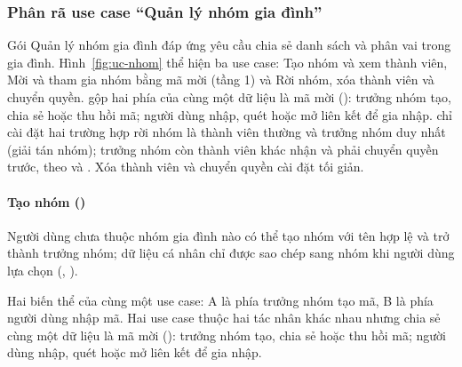 \subsubsection{Phân rã use case “Quản lý nhóm gia đình”}\label{sssec:pr-nhom}

Gói Quản lý nhóm gia đình đáp ứng yêu cầu chia sẻ danh sách và phân vai trong gia đình. Hình~\ref{fig:uc-nhom} thể hiện ba use case:  Tạo nhóm và xem thành viên,  Mời và tham gia nhóm bằng mã mời (tầng 1) và  Rời nhóm, xóa thành viên và chuyển quyền.  gộp hai phía của cùng một dữ liệu là mã mời (): trưởng nhóm tạo, chia sẻ hoặc thu hồi mã; người dùng nhập, quét hoặc mở liên kết để gia nhập.  chỉ cài đặt hai trường hợp rời nhóm là thành viên thường và trưởng nhóm duy nhất (giải tán nhóm); trưởng nhóm còn thành viên khác nhận  và phải chuyển quyền trước, theo  và . Xóa thành viên và chuyển quyền cài đặt tối giản.



\paragraph*{Tạo nhóm ()}
Người dùng chưa thuộc nhóm gia đình nào có thể tạo nhóm với tên hợp lệ và trở thành trưởng nhóm; dữ liệu cá nhân chỉ được sao chép sang nhóm khi người dùng lựa chọn (, ).

Hai biến thể của cùng một use case: A là phía trưởng nhóm tạo mã, B là phía người dùng nhập mã.
Hai use case thuộc hai tác nhân khác nhau nhưng chia sẻ cùng một dữ liệu là mã mời (): trưởng nhóm tạo, chia sẻ hoặc thu hồi mã; người dùng nhập, quét hoặc mở liên kết để gia nhập.

